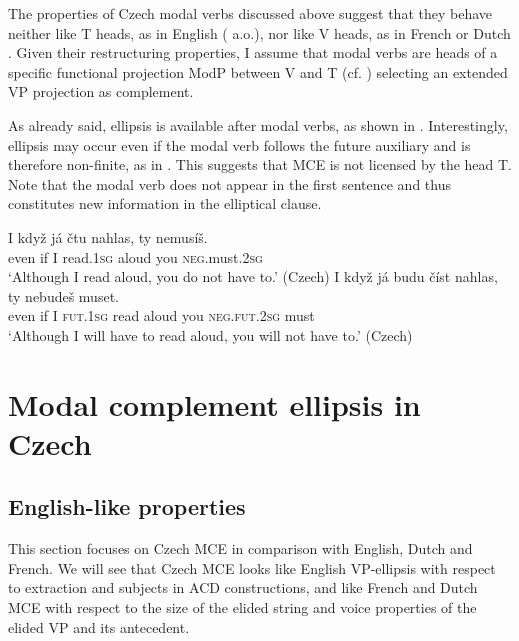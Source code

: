 \documentclass[output=paper,colorlinks,citecolor=brown,
modfonts
]{langscibook}
\begin{document}
\noindent The properties of Czech modal verbs discussed above suggest that they behave neither like T heads, as in English (\citealt{Sag1976} a.o.), nor like V heads, as in French or Dutch \citep{Aelbrecht2008,Dagnac2010}. Given their restructuring properties, I assume that modal verbs are heads of a specific functional projection ModP between V and T (cf. \citealt{Cinque2004}) selecting an extended VP projection as complement.

As already said, ellipsis is available after modal verbs, as shown in . Interestingly,  ellipsis may occur even if the modal verb follows the future auxiliary and is therefore non-finite, as in . This suggests that MCE is not licensed by the head T. Note that the modal verb does not appear in the first sentence and thus constitutes new information in the elliptical clause. 

\begin{exe}
\ex \label{17} 
\begin{xlist}
\ex \label{17a}\gll  I když  já čtu nahlas, ty    nemusíš.\\
 even if I read.\textsc{1sg} aloud   you \textsc{neg}.must.\textsc{2sg} \\
\glt `Although I read aloud, you do not have to.' \hfill (Czech)
\ex \label{17b} \gll I když   já budu číst nahlas,  ty    nebudeš  muset.\\
even if  I   \textsc{fut}.\textsc{1sg} read aloud you \textsc{neg}.\textsc{fut}.\textsc{2sg} must\\
\glt `Although I will have to read aloud, you will not have to.' \hfill (Czech)
\end{xlist}
\end{exe}

\section{Modal complement ellipsis in Czech} \label{sec:4} 

\subsection{English-like properties}\label{sec:4.1}

\sloppy This section focuses on Czech MCE in comparison with English, Dutch and French. We will see that Czech MCE looks like English VP-ellipsis with respect to extraction and subjects in ACD constructions, and like French and Dutch MCE with respect to the size of the elided string and voice properties of the elided VP and its antecedent. 
\end{document}
